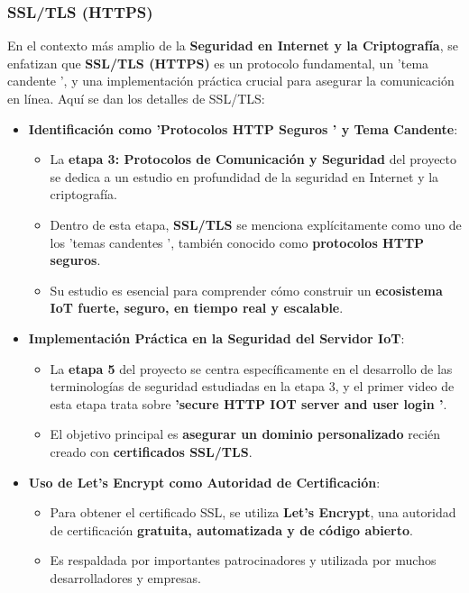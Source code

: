\documentclass{report}
\begin{document}
\subsubsection{SSL/TLS (HTTPS)}
En el contexto más amplio de la \textbf{Seguridad en Internet y la Criptografía}, se  enfatizan que \textbf{SSL/TLS (HTTPS)} es un protocolo 
fundamental, un  'tema candente ', y una implementación práctica crucial para asegurar la comunicación en línea. Aquí se dan los detalles de SSL/TLS:

\begin{itemize}
    \item \textbf{Identificación como  'Protocolos HTTP Seguros ' y Tema Candente}:
    \begin{itemize}
        \item La \textbf{etapa 3: Protocolos de Comunicación y Seguridad} del proyecto se dedica a un estudio en profundidad de la seguridad en 
        Internet y la criptografía.
        \item Dentro de esta etapa, \textbf{SSL/TLS} se menciona explícitamente como uno de los  'temas candentes ', también conocido como 
        \textbf{protocolos HTTP seguros}.
        \item Su estudio es esencial para comprender cómo construir un \textbf{ecosistema IoT fuerte, seguro, en tiempo real y escalable}.
    \end{itemize}

    \item \textbf{Implementación Práctica en la Seguridad del Servidor IoT}:
    \begin{itemize}
        \item La \textbf{etapa 5} del proyecto se centra específicamente en el desarrollo de las terminologías de seguridad estudiadas en la 
        etapa 3, y el primer video de esta etapa trata sobre \textbf{ 'secure HTTP IOT server and user login '}.
        \item El objetivo principal es \textbf{asegurar un dominio personalizado} recién creado con \textbf{certificados SSL/TLS}.
    \end{itemize}

    \item \textbf{Uso de Let's Encrypt como Autoridad de Certificación}:
    \begin{itemize}
        \item Para obtener el certificado SSL, se utiliza \textbf{Let's Encrypt}, una autoridad de certificación \textbf{gratuita, 
        automatizada y de código abierto}.
        \item Es respaldada por importantes patrocinadores y utilizada por muchos desarrolladores y empresas.
    \end{itemize}


\end{itemize}
\end{document}
